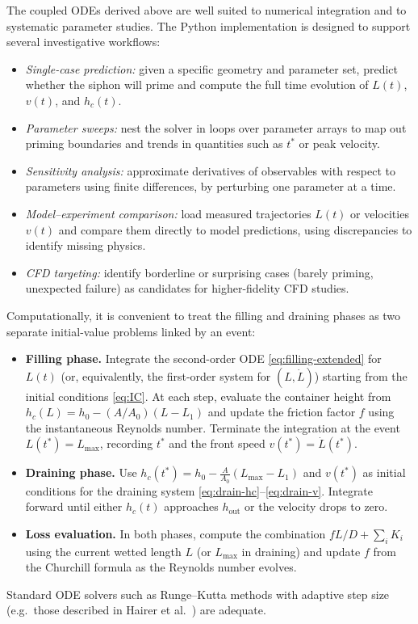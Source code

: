 \documentclass[11pt]{article}
\begin{document}
The coupled ODEs derived above are well suited to numerical integration and to systematic
parameter studies. The Python implementation is designed to support several investigative
workflows:
\begin{itemize}
  \item \emph{Single-case prediction:} given a specific geometry and parameter set, predict
        whether the siphon will prime and compute the full time evolution of $L(t)$, $v(t)$,
        and $h_c(t)$.
  \item \emph{Parameter sweeps:} nest the solver in loops over parameter arrays to map out
        priming boundaries and trends in quantities such as $t^*$ or peak velocity.
  \item \emph{Sensitivity analysis:} approximate derivatives of observables with respect to
        parameters using finite differences, by perturbing one parameter at a time.
  \item \emph{Model--experiment comparison:} load measured trajectories $L(t)$ or velocities
        $v(t)$ and compare them directly to model predictions, using discrepancies to identify
        missing physics.
  \item \emph{CFD targeting:} identify borderline or surprising cases (barely priming,
        unexpected failure) as candidates for higher-fidelity CFD studies.
\end{itemize}
Computationally, it is convenient to treat the filling and draining phases as two separate
initial-value problems linked by an event:
\begin{itemize}
  \item \textbf{Filling phase.} Integrate the second-order ODE \eqref{eq:filling-extended}
        for $L(t)$ (or, equivalently, the first-order system for $(L,\dot L)$) starting from
        the initial conditions \eqref{eq:IC}. At each step, evaluate the container height from
        $h_c(L)=h_0-(A/A_0)(L-L_1)$ and update the friction factor $f$ using the instantaneous
        Reynolds number. Terminate the integration at the event $L(t^*)=L_{\max}$, recording
        $t^*$ and the front speed $v(t^*)=\dot L(t^*)$.
  \item \textbf{Draining phase.} Use $h_c(t^*) = h_0 - \tfrac{A}{A_0}(L_{\max}-L_1)$ and
        $v(t^*)$ as initial conditions for the draining system \eqref{eq:drain-hc}--\eqref{eq:drain-v}.
        Integrate forward until either $h_c(t)$ approaches $h_{\text{out}}$ or the velocity
        drops to zero.
  \item \textbf{Loss evaluation.} In both phases, compute the combination
        $fL/D+\sum_i K_i$ using the current wetted length $L$ (or $L_{\max}$ in draining)
        and update $f$ from the Churchill formula as the Reynolds number evolves.
\end{itemize}
Standard ODE solvers such as Runge--Kutta methods with adaptive step size (e.g.\ those
described in Hairer et al.~\cite{hairer}) are adequate.
\end{document}
